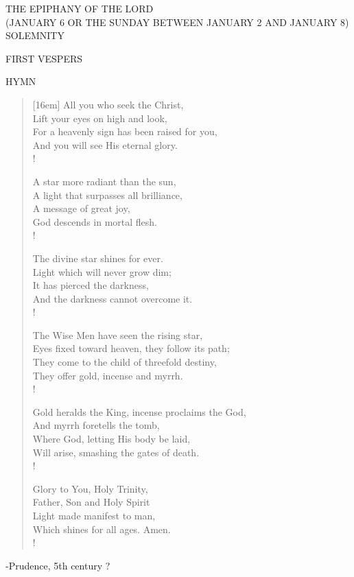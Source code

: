 \begin{center} \normalsize THE EPIPHANY OF THE LORD\\
\footnotesize (JANUARY 6 OR THE SUNDAY BETWEEN JANUARY 2 AND JANUARY 8)\\
\small SOLEMNITY
\end{center}

\begin{flushleft}\normalsize{\uppercase{FIRST VESPERS\\}}\end{flushleft}

\noindent\small{\uppercase{Hymn}}\normalsize\label{christmas:epiphany:firstVespers}
\begin{verse}[16em]
All you who seek the Christ,\\
Lift your eyes on high and look,\\
For a heavenly sign has been raised for you,\\
And you will see His eternal glory.\\!

A star more radiant than the sun,\\
A light that surpasses all brilliance,\\
A message of great joy,\\
God descends in mortal flesh.\\!

The divine star shines for ever.\\
Light which will never grow dim;\\
It has pierced the darkness,\\
And the darkness cannot overcome it.\\!

The Wise Men have seen the rising star,\\
Eyes fixed toward heaven, they follow its path;\\
They come to the child of threefold destiny,\\
They offer gold, incense and myrrh.\\!

Gold heralds the King, incense proclaims the God,\\
And myrrh foretells the tomb,\\
Where God, letting His body be laid,\\
Will arise, smashing the gates of death.\\!

Glory to You, Holy Trinity,\\
Father, Son and Holy Spirit\\
Light made manifest to man,\\
Which shines for all ages. Amen.\\!
\end{verse}
\begin{flushright}
\footnotesize -Prudence, 5th century ?
\end{flushright}

